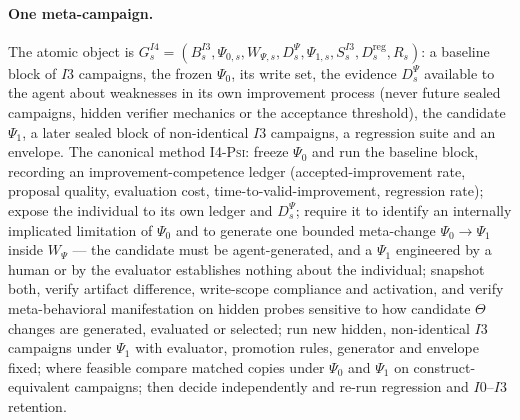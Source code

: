 \paragraph{One meta-campaign.} The atomic object is $G^{I4}_s = (B^{I3}_s, \Psi_{0,s}, W_{\Psi,s}, D^{\Psi}_s, \Psi_{1,s}, S^{I3}_s, D^{\mathrm{reg}}_s, R_s)$: a baseline block of $I3$ campaigns, the frozen $\Psi_0$, its write set, the evidence $D^{\Psi}_s$ available to the agent about weaknesses in its own improvement process (never future sealed campaigns, hidden verifier mechanics or the acceptance threshold), the candidate $\Psi_1$, a later sealed block of non-identical $I3$ campaigns, a regression suite and an envelope. The canonical method \textsc{I4-Psi}: freeze $\Psi_0$ and run the baseline block, recording an improvement-competence ledger (accepted-improvement rate, proposal quality, evaluation cost, time-to-valid-improvement, regression rate); expose the individual to its own ledger and $D^{\Psi}_s$; require it to identify an internally implicated limitation of $\Psi_0$ and to generate one bounded meta-change $\Psi_0 \to \Psi_1$ inside $W_\Psi$ --- the candidate must be agent-generated, and a $\Psi_1$ engineered by a human or by the evaluator establishes nothing about the individual; snapshot both, verify artifact difference, write-scope compliance and activation, and verify meta-behavioral manifestation on hidden probes sensitive to how candidate $\Theta$ changes are generated, evaluated or selected; run new hidden, non-identical $I3$ campaigns under $\Psi_1$ with evaluator, promotion rules, generator and envelope fixed; where feasible compare matched copies under $\Psi_0$ and $\Psi_1$ on construct-equivalent campaigns; then decide independently and re-run regression and $I0$--$I3$ retention.

